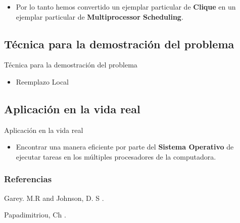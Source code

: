 \documentclass[spanish, xcolor=dvipsnames, aspectratio=169]{beamer}
\newcommand{\subsectiontitle}{}
\begin{document}
\begin{frame}{\subsectiontitle}
    \begin{itemize}
        \item Por lo tanto hemos convertido un ejemplar particular de \textbf{Clique} en un ejemplar particular de \textbf{Multiprocessor Scheduling}.
    \end{itemize}
\end{frame}
\renewcommand{\subsectiontitle}{Técnica para la demostración del problema}
\subsection{\subsectiontitle}
\begin{frame}{\subsectiontitle}
\begin{itemize}
    \item Reemplazo Local
\end{itemize}
\end{frame}
\renewcommand{\subsectiontitle}{Aplicación en la vida real}
\subsection{\subsectiontitle}
\begin{frame}{\subsectiontitle}
\begin{itemize}
    \item Encontrar una manera eficiente por parte del \textbf{Sistema Operativo} de ejecutar tareas en los múltiples procesadores de la computadora.
\end{itemize}
\end{frame}

\begin{frame}[t, allowframebreaks]
\frametitle{Referencias}
\begin{thebibliography}{10}
\alert{Garey. M.R and Johnson, D. S}
.

\alert{Papadimitriou, Ch}
.
\end{thebibliography}

\end{frame}
\end{document}
